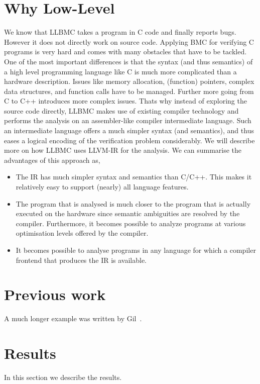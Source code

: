 \documentclass[14pt]{article}
\begin{document}
\section{Why Low-Level}\label{Low-Level}
We know that LLBMC takes a program in C code and finally reports bugs. However it does not directly work on source code. Applying BMC for verifying C programs is very hard and comes with many obstacles that have to be tackled. One of the most important differences is that the syntax (and thus semantics) of a high level programming language like C is much more complicated than a hardware description. Issues like memory allocation, (function) pointers, complex data structures, and function calls have to be managed. Further more going from C to C++ introduces more complex issues. Thats why instead of exploring the source code directly, LLBMC makes use of existing compiler technology and performs the analysis on an assembler-like compiler intermediate language. Such an intermediate language offers a much simpler syntax (and semantics), and thus eases a logical encoding of the verification problem considerably. We will describe more on how LLBMC uses LLVM-IR for the analysis. We can summarise the advantages of this approach as,
\begin{itemize}
   \item The IR has much simpler syntax and semantics than C/C++. This makes it relatively easy to support (nearly) all language features.
     \item The program that is analysed is much closer to the program that is actually executed on the hardware since semantic ambiguities are resolved by the compiler. Furthermore, it becomes possible to analyze programs at various optimisation levels offered by the compiler.
  \item It becomes possible to analyse programs in any language for which a compiler frontend that produces the IR is available.
  
\end{itemize}

\section{Previous work}\label{previous work}
A much longer \LaTeXe{} example was written by Gil~\cite{Gil:02}.


\section{Results}\label{results}
In this section we describe the results.
\end{document}
